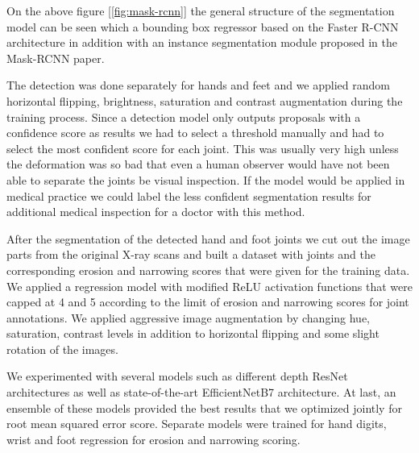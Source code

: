 \documentclass[a4paper,12pt]{article}
\begin{document}
\par On the above figure [\ref{fig:mask-rcnn}] the general structure of the segmentation model can be seen which a bounding box regressor based on the Faster R-CNN \cite{ren2015faster} architecture in addition with an instance segmentation module proposed in the Mask-RCNN paper.

\vspace{4mm}

\par The detection was done separately for hands and feet and we applied random horizontal flipping, brightness, saturation and contrast augmentation during the training process. Since a detection model only outputs proposals with a confidence score as results we had to select a threshold manually and had to select the most confident score for each joint. This was usually very high unless the deformation was so bad that even a human observer would have not been able to separate the joints be visual inspection. If the model would be applied in medical practice we could label the less confident segmentation results for additional medical inspection for a doctor with this method.

\vspace{4mm}

\par After the segmentation of the detected hand and foot joints we cut out the image parts from the original X-ray scans and built a dataset with joints and the corresponding erosion and narrowing scores that were given for the training data. We applied a regression model with modified ReLU activation functions that were capped at 4 and 5 according to the limit of erosion and narrowing scores for joint annotations. We applied aggressive image augmentation by changing hue, saturation, contrast levels in addition to horizontal flipping and some slight rotation of the images.

\vspace{4mm}

\par We experimented with several models such as different depth ResNet \cite{he2016deep} architectures as well as state-of-the-art EfficientNetB7 \cite{tan2019efficientnet} architecture. At last, an ensemble of these models provided the best results that we optimized jointly for root mean squared error score. Separate models were trained for hand digits, wrist and foot regression for erosion and narrowing scoring.

\vspace{4mm}
\end{document}

